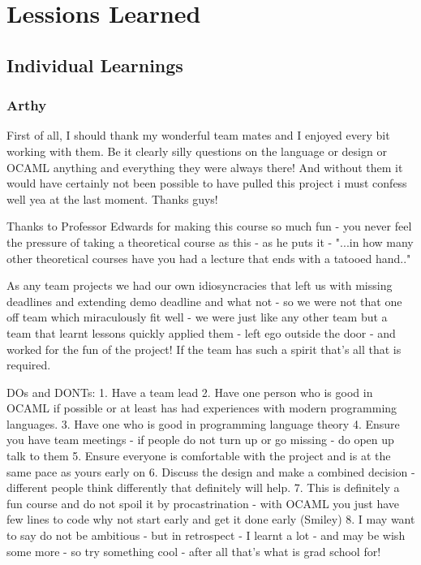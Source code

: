 \section{Lessions Learned}
\subsection{Individual Learnings}
\subsubsection*{Arthy}
First of all, I should thank my wonderful team mates and I enjoyed every bit working with them. Be it clearly silly
questions on the language or design or OCAML anything and everything they were always there! And without them it would
have certainly not been possible to have pulled this project i must confess well yea at the last moment. Thanks guys!

Thanks to Professor Edwards for making this course so much fun - you never feel the pressure of taking a theoretical course as this - as he puts it - "...in how many other theoretical courses have you had a lecture that ends with a tatooed hand.." 

As any team projects we had our own idiosyncracies that left us with missing deadlines and extending demo deadline and what not - so we were not that one off team which miraculously fit well - we were just like any other team but a team that learnt lessons quickly applied them - left ego outside the door - and worked for the fun of the project! If the team has such a spirit that's all that is required.

DOs and DONTs:
1. Have a team lead 
2. Have one person who is good in OCAML if possible or at least has had experiences with modern programming languages.
3. Have one who is good in programming language theory 
4. Ensure you have team meetings - if people do not turn up or go missing - do open up talk to them 
5. Ensure everyone is comfortable with the project and is at the same pace as yours early on
6. Discuss the design and make a combined decision - different people think differently that definitely will help.
7. This is definitely a fun course and do not spoil it by procastrination - with OCAML you just have few lines to 
code why not start early and get it done early (Smiley)
8. I may want to say do not be ambitious - but in retrospect - I learnt a lot - and may be wish some more - so 
try something cool - after all that's what is grad school for!

